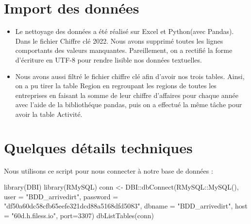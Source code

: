 \documentclass[mstat,12pt]{unswthesis}
\newenvironment{Shaded}{\begin{snugshade}}{\end{snugshade}}
\newcommand{\AttributeTok}[1]{\textcolor[rgb]{0.77,0.63,0.00}{#1}}
\newcommand{\DecValTok}[1]{\textcolor[rgb]{0.00,0.00,0.81}{#1}}
\newcommand{\FunctionTok}[1]{\textcolor[rgb]{0.00,0.00,0.00}{#1}}
\newcommand{\NormalTok}[1]{#1}
\newcommand{\OtherTok}[1]{\textcolor[rgb]{0.56,0.35,0.01}{#1}}
\newcommand{\SpecialCharTok}[1]{\textcolor[rgb]{0.00,0.00,0.00}{#1}}
\newcommand{\StringTok}[1]{\textcolor[rgb]{0.31,0.60,0.02}{#1}}
\begin{document}
\bigskip

\hypertarget{import-des-donnuxe9es}{%
\section{Import des données}\label{import-des-donnuxe9es}}

\begin{itemize}
\item
  Le nettoyage des données a été réalisé sur Excel et Python(avec
  Pandas). Dans le fichier Chiffre clé 2022. Nous avons supprimé toutes
  les lignes comportants des valeurs manquantes. Pareillement, on a
  rectifié la forme d'écriture en UTF-8 pour rendre lisible nos données
  textuelles.
\item
  Nous avons aussi filtré le fichier chiffre clé afin d'avoir nos trois
  tables. Ainsi, on a pu tirer la table Region en regroupant les regions
  de toutes les entreprises en faisant la somme de leur chiffre
  d'affaires pour chaque année avec l'aide de la bibliothéque pandas,
  puis on a effectué la même tâche pour avoir la table Activité.
\end{itemize}

\hypertarget{quelques-duxe9tails-techniques}{%
\section{Quelques détails
techniques}\label{quelques-duxe9tails-techniques}}

Nous utilisons ce script pour nous connecter à notre base de données :

\begin{Shaded}
\begin{Highlighting}[]
\FunctionTok{library}\NormalTok{(DBI)}
\FunctionTok{library}\NormalTok{(RMySQL)}
\NormalTok{conn }\OtherTok{\textless{}{-}}\NormalTok{ DBI}\SpecialCharTok{::}\FunctionTok{dbConnect}\NormalTok{(RMySQL}\SpecialCharTok{::}\FunctionTok{MySQL}\NormalTok{(), }
                  \AttributeTok{user =} \StringTok{"BDD\_arrivedirt"}\NormalTok{, }
                  \AttributeTok{password =} \StringTok{"df50a60dc58cfb65eefe321dcd88a5168dfd5083"}\NormalTok{, }
                  \AttributeTok{dbname =} \StringTok{"BDD\_arrivedirt"}\NormalTok{, }
                  \AttributeTok{host =} \StringTok{"60d.h.filess.io"}\NormalTok{,}
                \AttributeTok{port=}\DecValTok{3307}\NormalTok{)}
\FunctionTok{dbListTables}\NormalTok{(conn)}
\end{Highlighting}
\end{Shaded}
\end{document}
